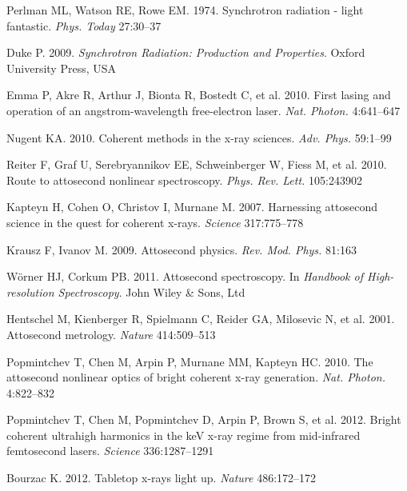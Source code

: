 \documentclass{ar-1col}
\begin{document}
\begin{thebibliography}{000}
Perlman ML, Watson RE, Rowe EM. 1974. Synchrotron radiation - light fantastic.
  \textit{Phys. Today} 27:30--37

Duke P. 2009. \textit{Synchrotron Radiation: Production and Properties}. Oxford
  University Press, {USA}

{Emma P}, {Akre R}, {Arthur J}, {Bionta R}, {Bostedt C}, et al. 2010. First lasing and operation of an
  {angstrom-wavelength} free-electron laser. \textit{Nat. Photon.} 4:641--647

Nugent KA. 2010. Coherent methods in the {x-ray} sciences. \textit{Adv. Phys.}
  59:1--99

Reiter F, Graf U, Serebryannikov EE, Schweinberger W, Fiess M, et al. 2010. Route
  to attosecond nonlinear spectroscopy. \textit{Phys. Rev. Lett.} 105:243902

Kapteyn H, Cohen O, Christov I, Murnane M. 2007. Harnessing attosecond science
  in the quest for coherent x-rays. \textit{Science} 317:775--778

Krausz F, Ivanov M. 2009. Attosecond physics. \textit{Rev. Mod. Phys.} 81:163

W\"{o}rner HJ, Corkum PB. 2011. Attosecond spectroscopy. In \textit{Handbook of
  High-resolution Spectroscopy}. John Wiley \& Sons, Ltd

Hentschel M, Kienberger R, Spielmann C, Reider GA, Milosevic N, et al. 2001. Attosecond metrology.
  \textit{Nature} 414:509--513

Popmintchev T, Chen M, Arpin P, Murnane MM, Kapteyn HC. 2010. The attosecond
  nonlinear optics of bright coherent x-ray generation. \textit{Nat. Photon.}
  4:822--832

Popmintchev T, Chen M, Popmintchev D, Arpin P, Brown S, et al. 2012. Bright coherent ultrahigh
  harmonics in the {keV} {x-ray} regime from {mid-infrared} femtosecond lasers.
  \textit{Science} 336:1287--1291

Bourzac K. 2012. Tabletop x-rays light up. \textit{Nature} 486:172--172


\end{thebibliography}
\end{document}
